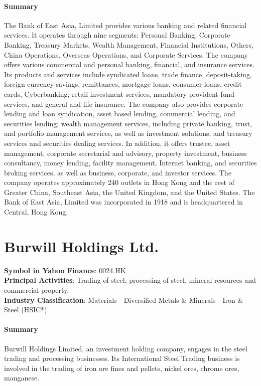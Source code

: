 \paragraph{Summary}
The Bank of East Asia, Limited provides various banking and related financial services. It operates through nine segments: Personal Banking, Corporate Banking, Treasury Markets, Wealth Management, Financial Institutions, Others, China Operations, Overseas Operations, and Corporate Services. The company offers various commercial and personal banking, financial, and insurance services. Its products and services include syndicated loans, trade finance, deposit-taking, foreign currency savings, remittances, mortgage loans, consumer loans, credit cards, Cyberbanking, retail investment services, mandatory provident fund services, and general and life insurance. The company also provides corporate lending and loan syndication, asset based lending, commercial lending, and securities lending; wealth management services, including private banking, trust, and portfolio management services, as well as investment solutions; and treasury services and securities dealing services. In addition, it offers trustee, asset management, corporate secretarial and advisory, property investment, business consultancy, money lending, facility management, Internet banking, and securities broking services, as well as business, corporate, and investor services. The company operates approximately 240 outlets in Hong Kong and the rest of Greater China, Southeast Asia, the United Kingdom, and the United States. The Bank of East Asia, Limited was incorporated in 1918 and is headquartered in Central, Hong Kong.


\section{Burwill Holdings Ltd.}
\textbf{Symbol in Yahoo Finance}: 0024.HK\\
\textbf{Principal Activities}: Trading of steel, processing of steel, mineral resources and commercial property.\\
\textbf{Industry Classification}: Materials - Diversified Metals \& Minerals - Iron \& Steel (HSIC*)
\paragraph{Summary}
Burwill Holdings Limited, an investment holding company, engages in the steel trading and processing businesses. Its International Steel Trading business is involved in the trading of iron ore fines and pellets, nickel ores, chrome ores, manganese.


